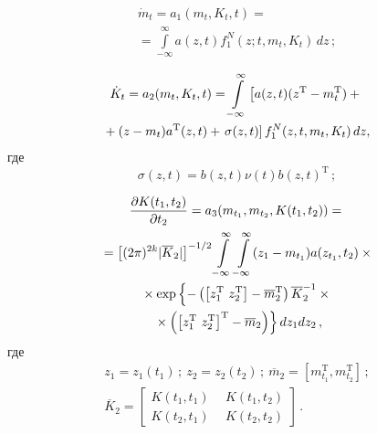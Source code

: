 \begin{multicols}{2}
  \vspace*{-12pt}
  
  \noindent
  \begin{multline}
     \dot{m}_t=a_1(m_t,K_t,t)={}\\
     {}=\int\limits_{-\infty}^\infty a(z,t)f_1^N 
(z;t,m_t,K_t)\,dz\,;\label{e9-sin}
     \end{multline}
     
     \noindent
     \begin{multline}
     \dot{K}_t =a_2(m_t,K_t,t)=\int\limits_{-\infty}^\infty \left[ a(z,t)(z^{\mathrm{T}}-
m_t^{\mathrm{T}})+{}\right.\\
\hspace*{-1mm}{}+(z-m_t)a^{\mathrm{T}}(z,t)+ %
\left.\sigma(z,t)\right] f_1^N(z,t,m_t,K_t)\,dz,\!
     \label{e10-sin}
     \end{multline}
     где
     \begin{equation*}
     \sigma(z,t)=b(z,t)\nu(t) b(z,t)^{\mathrm{T}}\,;
     \end{equation*}
     
     \vspace*{-12pt}
     
     \noindent
     \begin{multline}
     \displaystyle\frac{\displaystyle \partial K(t_1,t_2)\mathstrut}{\displaystyle \partial t_2\mathstrut}=a_3(m_{t_1},m_{t_2}, K(t_1,t_2))={}\\
     {}=\left[ 
(2\pi)^{2k}\vert \overline{K}_2\vert \right]^{-1/2}\int\limits_{-\infty}^\infty  
\int\limits_{-\infty}^\infty (z_1-m_{t_1})a(z_{t_1},t_2)\times{}\\
     {}\times 
     \exp \left\{ -\left(\left [ z_1^{\mathrm{T}}\ z_2^{\mathrm{T}}\right] -
     \overline{m}_2^{\mathrm{T}}\right) 
\overline{K}_2^{-1} \times{}\right.\\
\left.{}\times\left( \left[ z_1^{\mathrm{T}}\ z_2^{\mathrm{T}}\right]^{\mathrm{T}} -\overline{m}_2\right) 
\right\}dz_1dz_2\,,
     \label{e11-sin}
     \end{multline}
где
\begin{gather*}
z_1= z_1(t_1)\,;\  z_2=z_2(t_2)\,;\  \overline{m}_2=\left[ 
m^{\mathrm{T}}_{t_1},m^{\mathrm{T}}_{t_2}\right]\,;\\
\overline{K}_2=\begin{bmatrix}
K(t_1,t_1) & \ \ K(t_1,t_2)\\[6pt]
K(t_2,t_{1})&\ \  K(t_2,t_2)
\end{bmatrix}\,.
\end{gather*}
     

\end{multicols}
